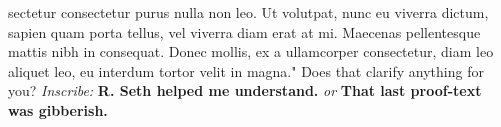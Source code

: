 \documentclass[11pt,letterpaper,openany]{scrbook}
\begin{document}
\begin{sloppypar}
\begin{paracol}{2}
\end{paracol}



\begin{paracol}{1}

\fontsize{11}{13}\leftfont sectetur consectetur purus nulla non leo. Ut volutpat, nunc eu viverra dictum, sapien quam porta tellus, vel viverra diam erat at mi. Maecenas pellentesque mattis nibh in consequat. Donec mollis, ex a ullamcorper consectetur, diam leo aliquet leo, eu interdum tortor velit in magna." Does that clarify anything for you?  \leftfont \textit{Inscribe:} \textbf{R. Seth helped me understand.} \textit{or} \textbf{That last proof-text was gibberish.}

\end{paracol}

\end{sloppypar}
\end{document}

